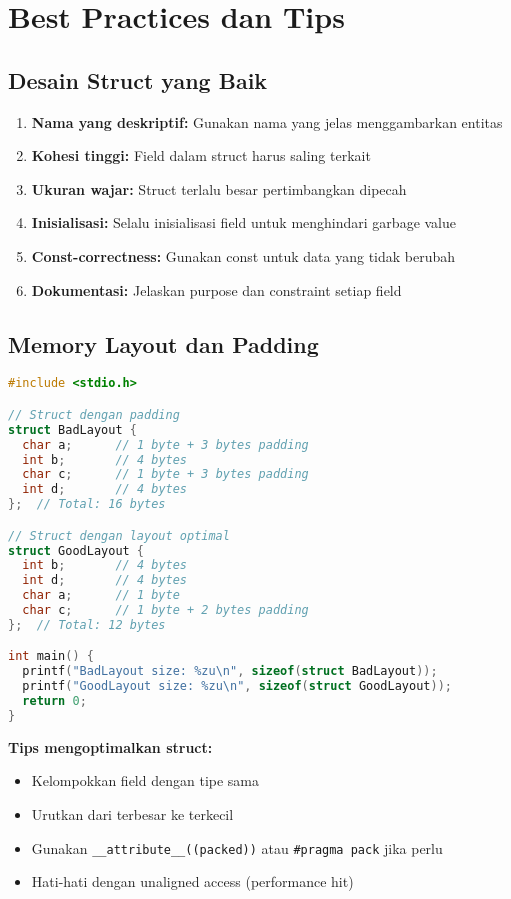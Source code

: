 \documentclass[../main.tex]{subfiles}
\begin{document}
\section{Best Practices dan Tips}

\subsection{Desain Struct yang Baik}

\begin{enumerate}
  \item \textbf{Nama yang deskriptif:} Gunakan nama yang jelas menggambarkan entitas
  \item \textbf{Kohesi tinggi:} Field dalam struct harus saling terkait
  \item \textbf{Ukuran wajar:} Struct terlalu besar pertimbangkan dipecah
  \item \textbf{Inisialisasi:} Selalu inisialisasi field untuk menghindari garbage value
  \item \textbf{Const-correctness:} Gunakan const untuk data yang tidak berubah
  \item \textbf{Dokumentasi:} Jelaskan purpose dan constraint setiap field
\end{enumerate}

\subsection{Memory Layout dan Padding}

\begin{lstlisting}[language=C, caption={Struct padding di C}]
#include <stdio.h>

// Struct dengan padding
struct BadLayout {
  char a;      // 1 byte + 3 bytes padding
  int b;       // 4 bytes
  char c;      // 1 byte + 3 bytes padding
  int d;       // 4 bytes
};  // Total: 16 bytes

// Struct dengan layout optimal
struct GoodLayout {
  int b;       // 4 bytes
  int d;       // 4 bytes
  char a;      // 1 byte
  char c;      // 1 byte + 2 bytes padding
};  // Total: 12 bytes

int main() {
  printf("BadLayout size: %zu\n", sizeof(struct BadLayout));
  printf("GoodLayout size: %zu\n", sizeof(struct GoodLayout));
  return 0;
}
\end{lstlisting}

\textbf{Tips mengoptimalkan struct:}
\begin{itemize}
  \item Kelompokkan field dengan tipe sama
  \item Urutkan dari terbesar ke terkecil
  \item Gunakan \texttt{\_\_attribute\_\_((packed))} atau \texttt{\#pragma pack} jika perlu
  \item Hati-hati dengan unaligned access (performance hit)
\end{itemize}
\end{document}
